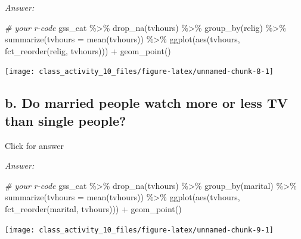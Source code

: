 \documentclass[
]{book}
\newenvironment{Shaded}{\begin{snugshade}}{\end{snugshade}}
\newcommand{\AttributeTok}[1]{\textcolor[rgb]{0.77,0.63,0.00}{#1}}
\newcommand{\CommentTok}[1]{\textcolor[rgb]{0.56,0.35,0.01}{\textit{#1}}}
\newcommand{\FunctionTok}[1]{\textcolor[rgb]{0.00,0.00,0.00}{#1}}
\newcommand{\NormalTok}[1]{#1}
\newcommand{\SpecialCharTok}[1]{\textcolor[rgb]{0.00,0.00,0.00}{#1}}
\begin{document}
\emph{Answer:}

\begin{Shaded}
\begin{Highlighting}[]
\CommentTok{\# your r{-}code}
\NormalTok{gss\_cat }\SpecialCharTok{\%\textgreater{}\%}
  \FunctionTok{drop\_na}\NormalTok{(tvhours) }\SpecialCharTok{\%\textgreater{}\%}
  \FunctionTok{group\_by}\NormalTok{(relig) }\SpecialCharTok{\%\textgreater{}\%}
  \FunctionTok{summarize}\NormalTok{(}\AttributeTok{tvhours =} \FunctionTok{mean}\NormalTok{(tvhours)) }\SpecialCharTok{\%\textgreater{}\%}
  \FunctionTok{ggplot}\NormalTok{(}\FunctionTok{aes}\NormalTok{(tvhours, }\FunctionTok{fct\_reorder}\NormalTok{(relig, tvhours))) }\SpecialCharTok{+}
    \FunctionTok{geom\_point}\NormalTok{()}
\end{Highlighting}
\end{Shaded}

\texttt{[image: class\_activity\_10\_files/figure-latex/unnamed-chunk-8-1]}

\hypertarget{b.-do-married-people-watch-more-or-less-tv-than-single-people}{%
\subsection{b. Do married people watch more or less TV than single people?}\label{b.-do-married-people-watch-more-or-less-tv-than-single-people}}

Click for answer

\emph{Answer:}

\begin{Shaded}
\begin{Highlighting}[]
\CommentTok{\# your r{-}code}
\NormalTok{gss\_cat }\SpecialCharTok{\%\textgreater{}\%}
  \FunctionTok{drop\_na}\NormalTok{(tvhours) }\SpecialCharTok{\%\textgreater{}\%}
  \FunctionTok{group\_by}\NormalTok{(marital) }\SpecialCharTok{\%\textgreater{}\%}
  \FunctionTok{summarize}\NormalTok{(}\AttributeTok{tvhours =} \FunctionTok{mean}\NormalTok{(tvhours)) }\SpecialCharTok{\%\textgreater{}\%}
  \FunctionTok{ggplot}\NormalTok{(}\FunctionTok{aes}\NormalTok{(tvhours, }\FunctionTok{fct\_reorder}\NormalTok{(marital, tvhours))) }\SpecialCharTok{+}
    \FunctionTok{geom\_point}\NormalTok{()}
\end{Highlighting}
\end{Shaded}

\texttt{[image: class\_activity\_10\_files/figure-latex/unnamed-chunk-9-1]}
\end{document}
